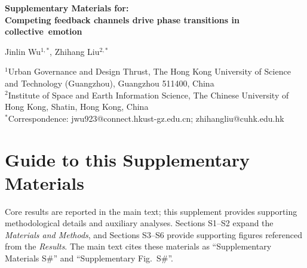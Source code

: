 \documentclass[11pt]{article}
\begin{document}
\linenumbers %

\begin{center}
{\LARGE\bfseries Supplementary Materials for:\\
Competing feedback channels drive phase transitions in collective~emotion}

\vspace{1em}

{\large Jinlin Wu$^{1,\ast}$, Zhihang Liu$^{2,\ast}$}

\vspace{0.5em}

{\small
$^{1}$Urban Governance and Design Thrust, The Hong Kong University of Science and Technology (Guangzhou), Guangzhou 511400, China\\
$^{2}$Institute of Space and Earth Information Science, The Chinese University of Hong Kong, Shatin, Hong Kong, China\\[0.3em]
$^\ast$Correspondence: jwu923@connect.hkust-gz.edu.cn; zhihangliu@cuhk.edu.hk
}
\end{center}

\vspace{1em}

\renewcommand{\contentsname}{Supplementary Contents}
\setcounter{tocdepth}{2}
\tableofcontents
\clearpage
\FloatBarrier

\section*{Guide to this Supplementary Materials}
Core results are reported in the main text; this supplement provides supporting methodological details and auxiliary analyses. Sections S1--S2 expand the \emph{Materials and Methods}, and Sections S3--S6 provide supporting figures referenced from the \emph{Results}. The main text cites these materials as ``Supplementary Materials S\#'' and ``Supplementary Fig.~S\#''.
\end{document}
